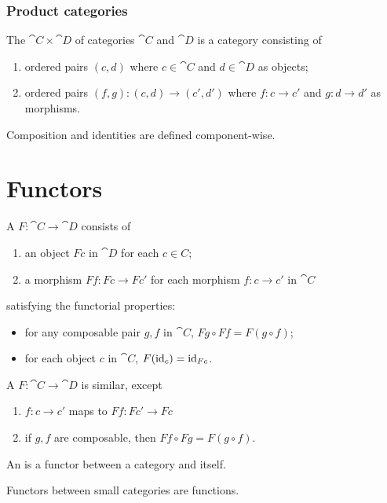 \subsubsection{Product categories}
\begin{definition}
The  $\cat{C}\times \cat{D}$ of categories $\cat{C}$ and $\cat{D}$  is a category consisting of
\begin{enumerate}
\item ordered pairs $(c,d)$ where $c\in \cat{C}$ and $d\in \cat{D}$ as objects;
\item ordered pairs $(f,g): (c,d) \to (c',d')$ where $f:c\to c'$ and $g:d\to d'$ as morphisms.
\end{enumerate}
Composition and identities are defined component-wise.
\end{definition}



\section{Functors}
\begin{definition}
A  $F:\cat{C}\to\cat{D}$ consists of
\begin{enumerate}
\item an object $Fc$ in $\cat{D}$ for each $c\in C$;
\item a morphism $Ff: Fc\to Fc'$ for each morphism $f:c\to c'$ in $\cat{C}$
\end{enumerate}
satisfying the functorial properties:
\begin{itemize}
\item for any composable pair $g,f$ in $\cat{C}$, $Fg\circ Ff = F(g\circ f)$;
\item for each object $c$ in $\cat{C}$, $F(\operatorname{id}_c) = \operatorname{id}_{Fc}$.
\end{itemize}
A  $F:\cat{C}\to\cat{D}$ is similar, except
\begin{enumerate}
\item $f:c\to c'$ maps to $Ff: Fc'\to Fc$
\item if $g,f$ are composable, then $Ff \circ Fg = F(g\circ f)$.
\end{enumerate}
An  is a functor between a category and itself.
\end{definition}
Functors between small categories are functions.

